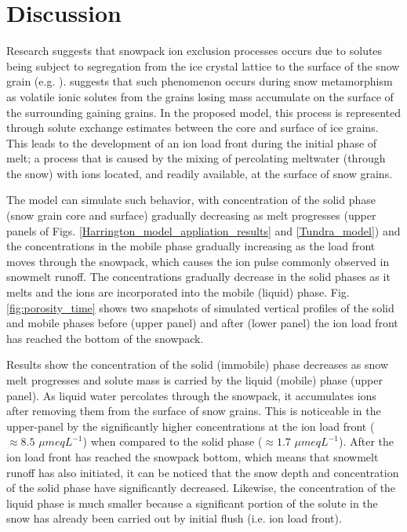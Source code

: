 \documentclass[authoryear,preprint,review,12pt]{elsarticle}
\begin{document}
\section{Discussion}
\label{chapter:discussion}

Research suggests that snowpack ion exclusion processes occurs due to solutes being subject to segregation from the ice crystal lattice to the surface of the snow grain (e.g. \citet{Colbeck1976,Davis1991}). \citet{Harrington1998} suggests that such phenomenon occurs during snow metamorphism as volatile ionic solutes from the grains losing mass accumulate on the surface of the surrounding gaining grains. In the proposed model, this process is represented through solute exchange estimates between the core and surface of ice grains. This leads to the development of an ion load front during the initial phase of melt; a process that is caused by the mixing of percolating meltwater (through the snow) with ions located, and readily available, at the surface of snow grains. \par

The model can simulate such behavior, with concentration of the solid phase (snow grain core and surface) gradually decreasing as melt progresses (upper panels of Figs. \ref{Harrington_model_appliation_results} and \ref{Tundra_model}) and the concentrations in the mobile phase gradually increasing as the load front moves through the snowpack, which causes the ion pulse commonly observed in snowmelt runoff. The concentrations gradually decrease in the solid phases as it melts and the ions are incorporated into the mobile (liquid) phase. Fig. \ref{fig:porosity_time} shows two snapshots of simulated vertical profiles of the solid and mobile phases before (upper panel) and after (lower panel) the ion load front has reached the bottom of the snowpack.


Results show the concentration of the solid (immobile) phase decreases as snow melt progresses and solute mass is carried by the liquid (mobile) phase (upper panel). As liquid water percolates through the snowpack, it accumulates ions after removing them from the surface of snow grains. This is noticeable in the upper-panel by the significantly higher concentrations at the ion load front ($\approx 8.5$ $\mu meq L^{-1}$) when compared to the solid phase ($\approx 1.7$ $\mu meq L^{-1}$). After the ion load front has reached the snowpack bottom, which means that snowmelt runoff has also initiated, it can be noticed that the snow depth and concentration of the solid phase have significantly decreased. Likewise, the concentration of the liquid phase is much smaller because a significant portion of the solute in the snow has already been carried out by initial flush (i.e. ion load front). \par
\end{document}

